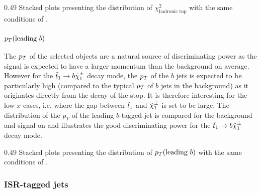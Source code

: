                      {0.49}
                     {Stacked plots presenting the distribution of $\chi^2_\text{hadronic top}$
                     with the same conditions of .}

        \subsubsection{$p_T(\text{leading } b)$}

        The $p_T$ of the selected objects are a natural source of discriminating power as
        the signal is expected to have a larger momentum than the background on average.
        However for the $\tilde{t}_1 \rightarrow b \tilde{\chi}_1^\pm$ decay mode, the $p_T$ of the
        $b$ jets is expected to be particularly high (compared to the typical $p_T$ of $b$ jets in the
        background) as it originates directly from the decay of the stop. It is therefore
        interesting for the low $x$ cases, i.e. where the gap between $\tilde{t}_1$ and
        $\tilde{\chi}_1^\pm$ is set to be large. The distribution of the $p_T$ of the leading
        $b$-tagged jet is compared for the background and signal on 
        and illustrates the good discriminating power for the $\tilde{t}_1 \rightarrow b \tilde{\chi}_1^\pm$
        decay mode.

                     {0.49}
                     {Stacked plots presenting the distribution of $p_T(\text{leading } b)$
                     with the same conditions of .}

        \subsubsection{ISR-tagged jets}

